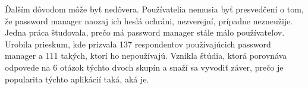 \par Ďalším dôvodom môže byť nedôvera. Používatelia nemusia byť presvedčení o tom, že password manager naozaj ich heslá ochráni, nezverejní, prípadne nezneužije. Jedna práca \cite{23} študovala, prečo má password manager stále málo používateľov. Urobila prieskum, kde prizvala 137 respondentov používajúcich password manager a 111 takých, ktorí ho nepoužívajú. Vznikla štúdia, ktorá porovnáva odpovede na 6 otázok týchto dvoch skupín a snaží sa vyvodiť záver, prečo je popularita týchto aplikácií taká, aká je.